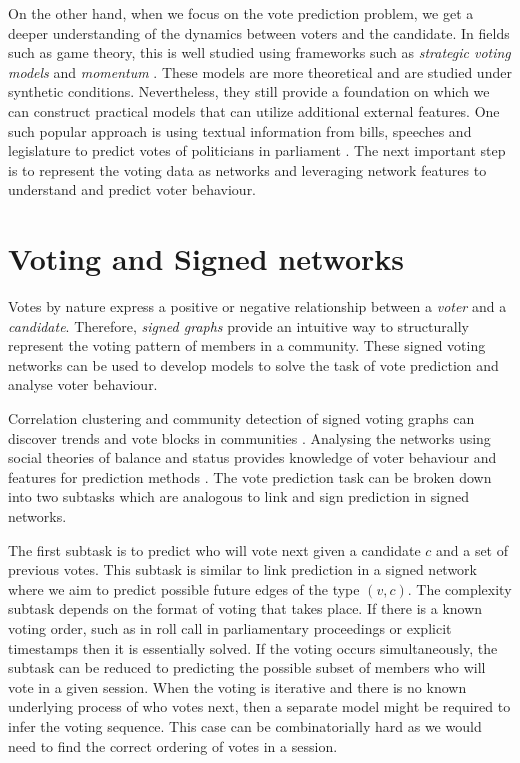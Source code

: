 On the other hand, when we focus on the vote prediction problem, we get a deeper understanding of the dynamics between voters and the candidate.
In fields such as game theory, this is well studied using frameworks such as \textit{strategic voting models} and \textit{momentum} \cite{meir2020strategic,zou2015strategicDoodle,ali2006a,banerjee1992simple,tal2015a}.
These models are more theoretical and are studied under synthetic conditions.
Nevertheless, they still provide a foundation on which we can construct practical models that can utilize additional external features.
One such popular approach is using textual information from bills, speeches and legislature to predict votes of politicians in parliament \cite{budhwar2018predicting,gerrish2011predicting}.
The next important step is to represent the voting data as networks and leveraging network features to understand and predict voter behaviour.


\section{Voting and Signed networks}
\label{sec:voting-signed-networks}
Votes by nature express a positive or negative relationship between a \textit{voter} and a \textit{candidate}.
Therefore, \textit{signed graphs} provide an intuitive way to structurally represent the voting pattern of members in a community.
These signed voting networks can be used to develop models to solve the task of vote prediction and analyse voter behaviour.

Correlation clustering and community detection of signed voting graphs can discover trends and vote blocks in communities \cite{brito2020aBrazil,arinik2017signed}.
Analysing the networks using social theories of balance and status provides knowledge of voter behaviour and features for prediction methods \cite{levorato2016brazilian,derr2018congressional}.
The vote prediction task can be broken down into two subtasks which are analogous to link and sign prediction in signed networks. 

The first subtask is to predict who will vote next given a candidate $c$ and a set of previous votes.
This subtask is similar to link prediction in a signed network where we aim to predict possible future edges of the type $(v,c)$.
The complexity subtask depends on the format of voting that takes place.
If there is a known voting order, such as in roll call in parliamentary proceedings or explicit timestamps then it is essentially solved.
If the voting occurs simultaneously, the subtask can be reduced to predicting the possible subset of members who will vote in a given session.
When the voting is iterative and there is no known underlying process of who votes next, then a separate model might be required to infer the voting sequence.
This case can be combinatorially  hard as we would need to find the correct ordering of votes in a session.

